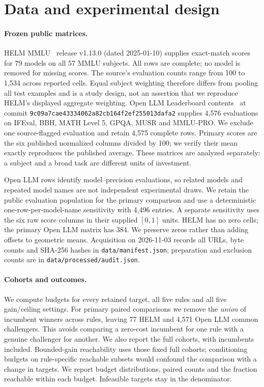 \section{Data and experimental design}
\label{sec:design}
\paragraph{Frozen public matrices.}
HELM MMLU~\citep{hendrycks2021mmlu,liang2023helm} release v1.13.0 (dated 2025-01-10) supplies exact-match scores for 79 models on all 57 MMLU subjects. All rows are complete; no model is removed for missing scores. The source's evaluation counts range from 100 to 1,534 across reported cells. Equal subject weighting therefore differs from pooling all test examples and is a study design, not an assertion that we reproduce HELM's displayed aggregate weighting. Open LLM Leaderboard contents~\citep{openllmcontents2025} at commit \texttt{9c09a7cae43334062a82cb164f2ef255013dafa2} supplies 4,576 evaluations on IFEval, BBH, MATH Level 5, GPQA, MUSR and MMLU-PRO. We exclude one source-flagged evaluation and retain 4,575 complete rows. Primary scores are the six published normalized columns divided by 100; we verify their mean exactly reproduces the published average. These matrices are analyzed separately: a subject and a broad task are different units of investment.

Open LLM rows identify model--precision evaluations, so related models and repeated model names are not independent experimental draws. We retain the public evaluation population for the primary comparison and use a deterministic one-row-per-model-name sensitivity with 4,496 entries. A separate sensitivity uses the six raw score columns in their supplied $[0,1]$ units. HELM has no zero cells; the primary Open LLM matrix has 384. We preserve zeros rather than adding offsets to geometric means. Acquisition on 2026-11-03 records all URLs, byte counts and SHA-256 hashes in \texttt{data/manifest.json}; preparation and exclusion counts are in \texttt{data/processed/audit.json}.

\paragraph{Cohorts and outcomes.}
We compute budgets for every retained target, all five rules and all five gain/ceiling settings. For primary paired comparisons we remove the \emph{union} of incumbent winners across rules, leaving 77 HELM and 4,571 Open LLM common challengers. This avoids comparing a zero-cost incumbent for one rule with a genuine challenger for another. We also report the full cohorts, with incumbents included. Bounded-gain reachability uses those fixed full cohorts; conditioning budgets on rule-specific reachable subsets would confound the comparison with a change in targets. We report budget distributions, paired counts and the fraction reachable within each budget. Infeasible targets stay in the denominator.

